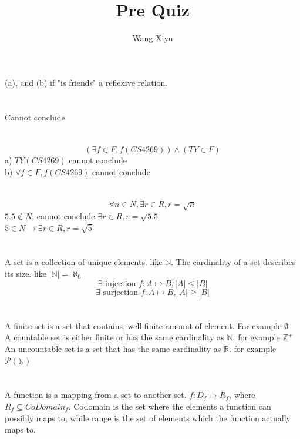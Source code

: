 \documentclass{article}
\begin{document}
\title{Pre Quiz}
\author{Wang Xiyu}
\date{}
\maketitle
\section{}
(a), and (b) if "is friends" a reflexive relation.
\section{}
Cannot conclude
\section{}
\[\left(\exists f \in F, f(CS4269)\right) \land (TY \in F)\]
a) $TY(CS4269)$ cannot conclude\\
b) $\forall f \in F, f(CS4269)$ cannot conclude\\
\section{}
\[\forall n \in N, \exists r \in R, r = \sqrt{n}\]
$5.5 \notin N$, cannot conclude $\exists r \in R, r = \sqrt{5.5}$\\
$5 \in N \rightarrow \exists r \in R, r = \sqrt{5}$
\section{}
A set is a collection of unique elements. like $\mathbb{N}$. 
The cardinality of a set describes its size. like $|\mathbb{N}| = \aleph_0$
\[\exists \text{ injection } f: A \mapsto B, |A| \leq |B|\]
\[\exists \text{ surjection } f: A \mapsto B, |A| \geq |B|\]
\section{}
A finite set is a set that contains, well finite amount of element. For example $\emptyset$\\
A countable set is either finite or has the same cardinality as $\mathbb{N}$. for example $\mathbb{Z^+}$\\
An uncountable set is a set that has the same cardinality as $\mathbb{R}$. for example $\mathcal{P}(\mathbb{N})$
\section{}
A function is a mapping from a set to another set. $f: D_f \mapsto R_f$, where $R_f \subseteq CoDomain_f$. Codomain 
is the set where the elements a function can possibly maps to, while range is the set of elements which the function 
actually maps to.
\end{document}
